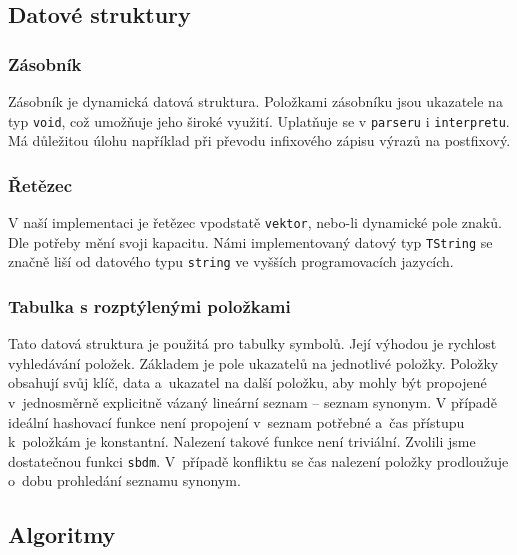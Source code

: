 \documentclass[a4paper, 12pt]{article}
\begin{document}
\newpage

\subsection{Datové struktury}

\subsubsection{Zásobník}
Zásobník je dynamická datová struktura. Položkami zásobníku jsou ukazatele
na typ \texttt{void}, což umožňuje jeho široké využití.
Uplatňuje se v \texttt{parseru} i \texttt{interpretu}. Má důležitou úlohu
například při převodu infixového zápisu výrazů na postfixový.

\subsubsection{Řetězec}
V naší implementaci je řetězec vpodstatě \texttt{vektor}, nebo-li dynamické pole znaků.
Dle potřeby mění svoji kapacitu. Námi implementovaný datový typ \texttt{TString}
se značně liší od datového typu \texttt{string} ve vyšších programovacích
jazycích.

\subsubsection{Tabulka s rozptýlenými položkami}

Tato datová struktura je použitá pro tabulky symbolů. Její výhodou je rychlost
vyhledávání položek. Základem je pole ukazatelů na jednotlivé položky. Položky
obsahují svůj klíč, data a~ukazatel na další položku, aby mohly být propojené
v~jednosměrně explicitně vázaný lineární seznam -- seznam synonym. V případě ideální
hashovací funkce není propojení v~seznam potřebné a~čas přístupu k~položkám je
konstantní. Nalezení takové funkce není triviální. Zvolili jsme dostatečnou
funkci \texttt{sbdm}\cite{sbdm}.
V~případě konfliktu se čas nalezení položky prodloužuje o~dobu prohledání
seznamu synonym.

\subsection{Algoritmy}
\end{document}
